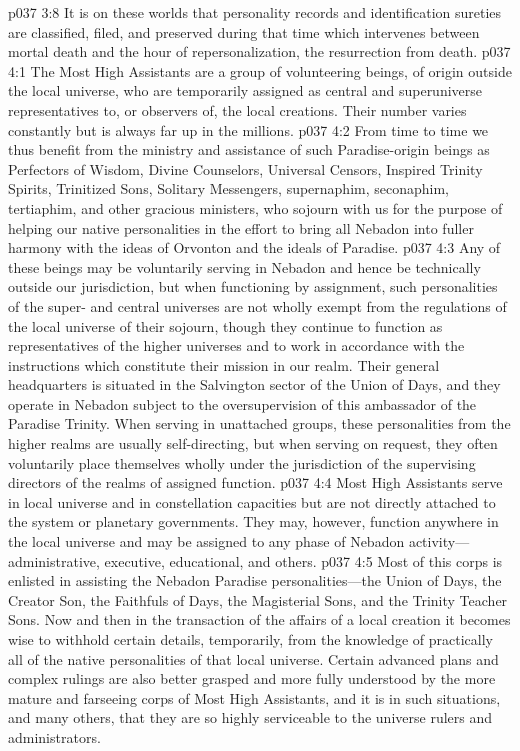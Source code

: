 \vs p037 3:8 It is on these worlds that personality records and identification sureties are classified, filed, and preserved during that time which intervenes between mortal death and the hour of repersonalization, the resurrection from death.
\vs p037 4:1 The Most High Assistants are a group of volunteering beings, of origin outside the local universe, who are temporarily assigned as central and superuniverse representatives to, or observers of, the local creations. Their number varies constantly but is always far up in the millions.
\vs p037 4:2 From time to time we thus benefit from the ministry and assistance of such Paradise\hyp{}origin beings as Perfectors of Wisdom, Divine Counselors, Universal Censors, Inspired Trinity Spirits, Trinitized Sons, Solitary Messengers, supernaphim, seconaphim, tertiaphim, and other gracious ministers, who sojourn with us for the purpose of helping our native personalities in the effort to bring all Nebadon into fuller harmony with the ideas of Orvonton and the ideals of Paradise.\plusone
\vs p037 4:3 Any of these beings may be voluntarily serving in Nebadon and hence be technically outside our jurisdiction, but when functioning by assignment, such personalities of the super\hyp{} and central universes are not wholly exempt from the regulations of the local universe of their sojourn, though they continue to function as representatives of the higher universes and to work in accordance with the instructions which constitute their mission in our realm. Their general headquarters is situated in the Salvington sector of the Union of Days, and they operate in Nebadon subject to the oversupervision of this ambassador of the Paradise Trinity. When serving in unattached groups, these personalities from the higher realms are usually self\hyp{}directing, but when serving on request, they often voluntarily place themselves wholly under the jurisdiction of the supervising directors of the realms of assigned function.
\vs p037 4:4 Most High Assistants serve in local universe and in constellation capacities but are not directly attached to the system or planetary governments. They may, however, function anywhere in the local universe and may be assigned to any phase of Nebadon activity---administrative, executive, educational, and others.
\vs p037 4:5 Most of this corps is enlisted in assisting the Nebadon Paradise personalities---the Union of Days, the Creator Son, the Faithfuls of Days, the Magisterial Sons, and the Trinity Teacher Sons. Now and then in the transaction of the affairs of a local creation it becomes wise to withhold certain details, temporarily, from the knowledge of practically all of the native personalities of that local universe. Certain advanced plans and complex rulings are also better grasped and more fully understood by the more mature and farseeing corps of Most High Assistants, and it is in such situations, and many others, that they are so highly serviceable to the universe rulers and administrators.
